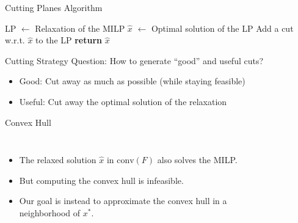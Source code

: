 \begin{frame}{Cutting Planes Algorithm}
     \begin{algorithmic}[1]
     \State LP $\gets$ Relaxation of the MILP
     \Repeat
    	\State $\hat{x}$ $\gets$ Optimal solution of the LP 
    		\State Add a cut w.r.t. $\hat{x}$ to the LP
    	\EndIf 
    \State \textbf{return} $\hat{x}$
   \end{algorithmic}
\end{frame}

\begin{frame}[c]{Cutting Strategy}
\centering\large
	Question: How to generate ``good'' and useful cuts?
	\begin{itemize}[<+(1)->]
	\item Good: Cut away as much as possible (while staying feasible)
	\item Useful: Cut away the optimal solution of the relaxation
	\end{itemize}
\end{frame}

\begin{frame}{Convex Hull}
\begin{columns}
\begin{itemize}
\item The relaxed solution $\hat{x}$ in $\text{conv}(F)$ also solves the MILP.
\item But computing the convex hull is infeasible.
\item Our goal is instead to approximate the convex hull in a neighborhood of $x^*$.
\end{itemize}

\begin{figure}[p]
        \centering
        
    \end{figure}
\end{columns}
\end{frame}

